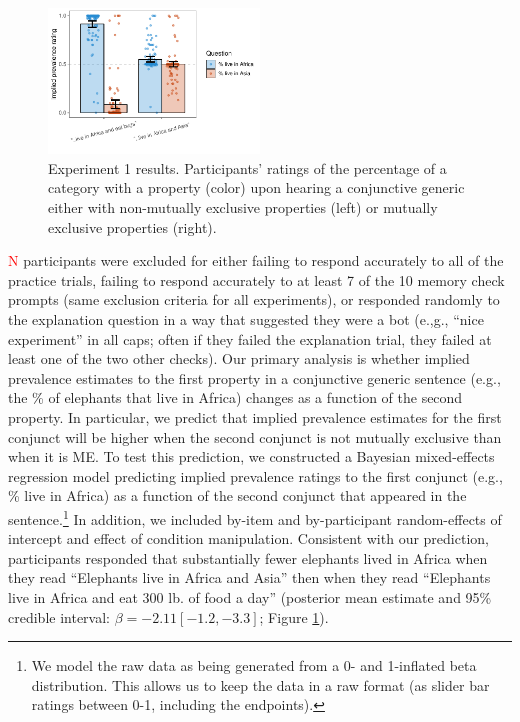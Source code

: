 \documentclass[10pt,letterpaper]{article}
\newcommand{\red}[1]{{\textcolor{Red}{#1}}}
\begin{document}
\begin{figure}[h]
  \centering
    \includegraphics[width=0.5\textwidth]{expt1_summary}
  \caption{Experiment 1 results. Participants' ratings of the percentage of a category with a property (color) upon hearing a conjunctive generic either with non-mutually exclusive properties (left) or mutually exclusive properties (right).}
  \label{fig:expt1}
\end{figure}


\red{N} participants were excluded for either failing to respond accurately to all of the practice trials, failing to respond accurately to at least 7 of the 10 memory check prompts (same exclusion criteria for all experiments), or responded randomly to the explanation question in a way that suggested they were a bot (e.,g., ``nice experiment'' in all caps; often if they failed the explanation trial, they failed at least one of the two other checks). 
Our primary analysis is whether implied prevalence estimates to the first property in a conjunctive generic sentence (e.g., the \% of elephants that live in Africa) changes as a function of the second property.
In particular, we predict that implied prevalence estimates for the first conjunct will be higher when the second conjunct is not mutually exclusive than when it is ME. 
To test this prediction, we constructed a Bayesian mixed-effects regression model predicting implied prevalence ratings to the first conjunct (e.g., \% live in Africa) as a function of the second conjunct that appeared in the sentence.\footnote{
 We model the raw data as being generated from a 0- and 1-inflated beta distribution. This allows us to keep the data in a raw format (as slider bar ratings between 0-1, including the endpoints).
}
In addition, we included by-item and by-participant random-effects of intercept and effect of condition manipulation.
Consistent with our prediction, participants responded that substantially fewer elephants lived in Africa when they read ``Elephants live in Africa and Asia'' then when they read ``Elephants live in Africa and eat 300 lb. of food a day'' (posterior mean estimate and 95\% credible interval: $\beta = -2.11 [-1.2, -3.3]$; Figure \ref{fig:expt1}).  
\end{document}
